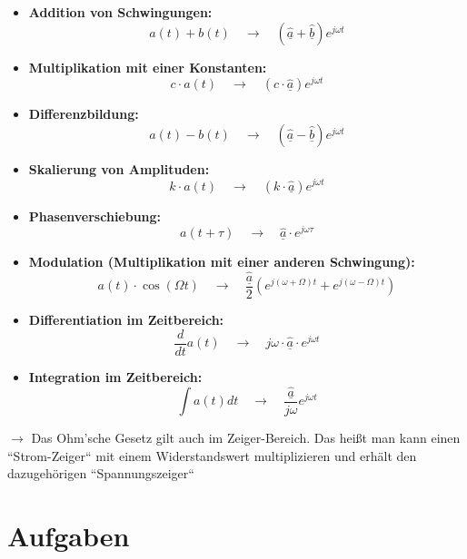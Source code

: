 \documentclass[11pt,a4paper]{article}
\begin{document}
\begin{itemize}
    \item \textbf{Addition von Schwingungen:} \quad 
    \[
    a(t) + b(t) \quad \rightarrow \quad (\hat{\underline{a}} + \hat{\underline{b}}) e^{j\omega t}
    \]

    \item \textbf{Multiplikation mit einer Konstanten:} \quad 
    \[
    c \cdot a(t) \quad \rightarrow \quad (c \cdot \hat{\underline{a}}) e^{j\omega t}
    \]

    \item \textbf{Differenzbildung:} \quad 
    \[
    a(t) - b(t) \quad \rightarrow \quad (\hat{\underline{a}} - \hat{\underline{b}}) e^{j\omega t}
    \]

    \item \textbf{Skalierung von Amplituden:} \quad 
    \[
    k \cdot a(t) \quad \rightarrow \quad (k \cdot \hat{\underline{a}}) e^{j\omega t}
    \]

    \item \textbf{Phasenverschiebung:} \quad 
    \[
    a(t + \tau) \quad \rightarrow \quad \hat{\underline{a}} \cdot e^{j\omega \tau}
    \]

    \item \textbf{Modulation (Multiplikation mit einer anderen Schwingung):} \quad 
    \[
    a(t) \cdot \cos(\Omega t) \quad \rightarrow \quad \frac{\hat{\underline{a}}}{2} \left( e^{j(\omega+\Omega)t} + e^{j(\omega-\Omega)t} \right)
    \]

    \item \textbf{Differentiation im Zeitbereich:} \quad 
    \[
    \frac{d}{dt} a(t) \quad \rightarrow \quad j\omega \cdot \hat{\underline{a}} \cdot e^{j\omega t}
    \]
 
    \item \textbf{Integration im Zeitbereich:} \quad 
    \[
    \int a(t) dt \quad \rightarrow \quad \frac{\hat{\underline{a}}}{j\omega} e^{j\omega t}
    \]
\end{itemize}
\vspace{1cm}
$\rightarrow$ Das Ohm'sche Gesetz gilt auch im Zeiger-Bereich. Das heißt man kann einen ``Strom-Zeiger`` mit einem Widerstandswert multiplizieren und erhält den dazugehörigen ``Spannungszeiger``



\newpage
\section{Aufgaben}
\end{document}

